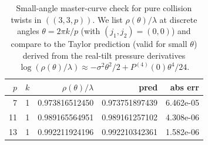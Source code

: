 \begin{table}[H]
\centering
\scriptsize
\setlength{\tabcolsep}{6pt}
\caption{Small-angle master-curve check for pure collision twists in $((3,3,p))$. We list $\rho(\theta)/\lambda$ at discrete angles $\theta=2\pi k/p$ (with $(j_1,j_2)=(0,0)$) and compare to the Taylor prediction (valid for small $\theta$) derived from the real-tilt pressure derivatives $\log(\rho(\theta)/\lambda)\approx -\sigma^2\theta^2/2+P^{(4)}(0)\theta^4/24$.}
\label{tab:real_input_40_arity_335_n2_master_curve}
\begin{tabular}{r r r r r}
\toprule
$p$ & $k$ & $\rho(\theta)/\lambda$ & pred & abs err\\
\midrule
7 & 1 & 0.973816512450 & 0.973751897439 & 6.462e-05\\
11 & 1 & 0.989165564951 & 0.989161257102 & 4.308e-06\\
13 & 1 & 0.992211924196 & 0.992210342361 & 1.582e-06\\
\bottomrule
\end{tabular}
\end{table}
